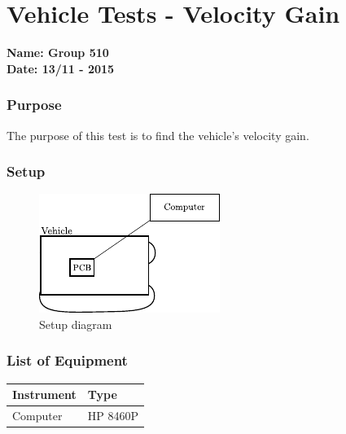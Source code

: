 \pagebreak
\section{Vehicle Tests - Velocity Gain}\label{app:gainTest}
\textbf{Name: Group 510}\\
\textbf{Date: 13/11 - 2015}

\subsubsection{Purpose}
The purpose of this test is to find the vehicle's velocity gain.

\subsubsection{Setup}

\begin{figure}[H]
	\centering
	\includegraphics[scale=1.6]{figures/inertiaTestSetupDiagram2.pdf}
	\caption{Setup diagram}
	\label{GainAndTimeTestSetupDiagram}
\end{figure}

\subsubsection{List of Equipment}

\begin{table}[H]
\begin{tabular}{|p{10cm}|p{4cm}|}
\hline%
  \textbf{Instrument}                     &  \textbf{Type}       \\
\hline%
  Computer                                &  HP 8460P    \\
\hline %
\end{tabular}
\end{table}

